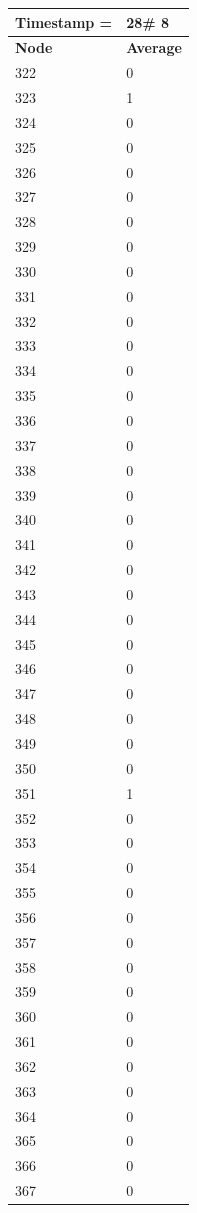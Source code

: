 \begin{tabular}{|l||l|}
\hline
\textbf{Timestamp =} & \textbf{28}\# 8\\\hline
	\textbf{Node} & \textbf{Average} \\ \hline
\hline
	322 & 0 \\ \hline
	323 & 1 \\ \hline
	324 & 0 \\ \hline
	325 & 0 \\ \hline
	326 & 0 \\ \hline
	327 & 0 \\ \hline
	328 & 0 \\ \hline
	329 & 0 \\ \hline
	330 & 0 \\ \hline
	331 & 0 \\ \hline
	332 & 0 \\ \hline
	333 & 0 \\ \hline
	334 & 0 \\ \hline
	335 & 0 \\ \hline
	336 & 0 \\ \hline
	337 & 0 \\ \hline
	338 & 0 \\ \hline
	339 & 0 \\ \hline
	340 & 0 \\ \hline
	341 & 0 \\ \hline
	342 & 0 \\ \hline
	343 & 0 \\ \hline
	344 & 0 \\ \hline
	345 & 0 \\ \hline
	346 & 0 \\ \hline
	347 & 0 \\ \hline
	348 & 0 \\ \hline
	349 & 0 \\ \hline
	350 & 0 \\ \hline
	351 & 1 \\ \hline
	352 & 0 \\ \hline
	353 & 0 \\ \hline
	354 & 0 \\ \hline
	355 & 0 \\ \hline
	356 & 0 \\ \hline
	357 & 0 \\ \hline
	358 & 0 \\ \hline
	359 & 0 \\ \hline
	360 & 0 \\ \hline
	361 & 0 \\ \hline
	362 & 0 \\ \hline
	363 & 0 \\ \hline
	364 & 0 \\ \hline
	365 & 0 \\ \hline
	366 & 0 \\ \hline
	367 & 0 \\ \hline
\end{tabular}
